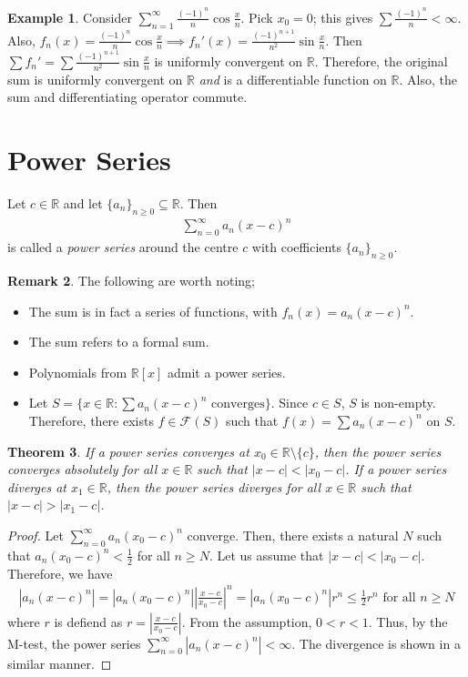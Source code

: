 \documentclass[15pt,a4paper]{book}
\newtheorem{theorem}{Theorem}[chapter]
\theoremstyle{definition}
\newtheorem{example}[theorem]{Example}
\newtheorem{remark}[theorem]{Remark}
\newcommand{\eax}[1]{\emph{#1}\index{#1}} %
\newcommand{\abs}[1]{\left| #1 \right|} %
\newcommand{\R}{\mathbb{R}} %
\newcommand{\cF}{\mathcal{F}}
\begin{document}
\begin{example}
    Consider $\sum_{n=1}^{\infty} \frac{(-1)^{n}}{n} \cos \frac{x}{n}$. Pick $x_{0} = 0$; this gives $\sum \frac{(-1)^{n}}{n} < \infty$. Also, $f_{n}(x) = \frac{(-1)^{n}}{n} \cos \frac{x}{n} \implies f_{n}'(x) = \frac{(-1)^{n+1}}{n^{2}} \sin \frac{x}{n}$. Then $\sum f_{n}' = \sum \frac{(-1)^{n+1}}{n^{2}} \sin \frac{x}{n}$ is uniformly convergent on $\R$. Therefore, the original sum is uniformly convergent on $\R$ \textit{and} is a differentiable function on $\R$. Also, the sum and differentiating operator commute.
\end{example}

\section{Power Series}
Let $c \in \R$ and let $\{a_{n}\}_{n \geq 0} \subseteq \R$. Then
\begin{align}
    \sum_{n=0}^{\infty} a_{n}(x-c)^{n}
\end{align}
is called a \eax{power series} around the centre $c$ with coefficients $\{a_{n}\}_{n \geq 0}$.
\begin{remark}
    The following are worth noting;
    \begin{itemize}
        \item The sum is in fact a series of functions, with $f_{n}(x) = a_{n}(x-c)^{n}$.
        \item The sum refers to a formal sum.
        \item Polynomials from $\R[x]$ admit a power series.
        \item Let $S = \{x \in \R : \sum a_{n}(x-c)^{n} \text{ converges}\}$. Since $c \in S$, $S$ is non-empty. Therefore, there exists $f \in \cF(S)$ such that $f(x) = \sum a_{n}(x-c)^{n}$ on $S$.
    \end{itemize}
\end{remark}

\begin{theorem}
    If a power series converges at $x_{0} \in \R\setminus\{c\}$, then the power series converges absolutely for all $x \in \R$ such that $\abs{x-c} < \abs{x_{0}-c}$. If a power series diverges at $x_{1} \in \R$, then the power series diverges for all $x \in \R$ such that $\abs{x-c} > \abs{x_{1}-c}$.
\end{theorem}
\begin{proof}
    Let $\sum_{n=0}^{\infty} a_{n}(x_{0}-c)^{n}$ converge. Then, there exists a natural $N$ such that $a_{n}(x_{0}-c)^{n} < \frac{1}{2}$ for all $n \geq N$. Let us assume that $\abs{x-c} < \abs{x_{0}-c}$. Therefore, we have
    \begin{align}
        \abs{a_{n}(x-c)^{n}} = \abs{a_{n}(x_{0}-c)^{n}} \abs{\frac{x-c}{x_{0}-c}}^{n} = \abs{a_{n}(x_{0}-c)^{n}} r^{n} \leq \frac{1}{2} r^{n} \text{ for all } n \geq N
    \end{align}
    where $r$ is defiend as $r = \abs{\frac{x-c}{x_{0}-c}}$. From the assumption, $0 < r < 1$. Thus, by the M-test, the power series $\sum_{n=0}^{\infty} \abs{a_{n}(x-c)^{n}} < \infty$. The divergence is shown in a similar manner.
\end{proof}
\end{document}
